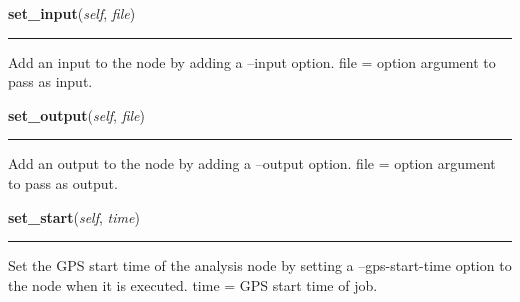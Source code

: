     \label{pipeline:AnalysisNode:set_input}
    \vspace{0.5ex}

    \noindent\begin{boxedminipage}{\textwidth}

    \raggedright \textbf{set\_input}(\textit{self}, \textit{file})

    \vspace{-1.5ex}

    \rule{\textwidth}{0.5\fboxrule}
    Add an input to the node by adding a --input option. file = option 
    argument to pass as input.

    \vspace{1ex}

    \end{boxedminipage}

    \label{pipeline:AnalysisNode:set_output}
    \vspace{0.5ex}

    \noindent\begin{boxedminipage}{\textwidth}

    \raggedright \textbf{set\_output}(\textit{self}, \textit{file})

    \vspace{-1.5ex}

    \rule{\textwidth}{0.5\fboxrule}
    Add an output to the node by adding a --output option. file = option 
    argument to pass as output.

    \vspace{1ex}

    \end{boxedminipage}

    \label{pipeline:AnalysisNode:set_start}
    \vspace{0.5ex}

    \noindent\begin{boxedminipage}{\textwidth}

    \raggedright \textbf{set\_start}(\textit{self}, \textit{time})

    \vspace{-1.5ex}

    \rule{\textwidth}{0.5\fboxrule}
    Set the GPS start time of the analysis node by setting a 
    --gps-start-time option to the node when it is executed. time = GPS 
    start time of job.

    \vspace{1ex}

    \end{boxedminipage}

